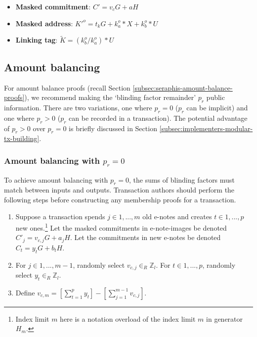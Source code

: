 \begin{itemize}
    \item \textbf{Masked commitment}: $C' = v_c G + a H$
    \item \textbf{Masked address}: $K'^o = t_k G + k^o_a*X + k^o_b*U$
    \item \textbf{Linking tag}: $\tilde{K} = (k^o_b/k^o_a)*U$
\end{itemize}


\subsection{Amount balancing}
\label{subsec:implementers-amount-balancing}

For amount balance proofs (recall Section \ref{subsec:seraphis-amount-balance-proofs}), we recommend making the `blinding factor remainder' $p_r$ public information. There are two variations, one where $p_r = 0$ ($p_r$ can be implicit) and one where $p_r > 0$ ($p_r$ can be recorded in a transaction). The potential advantage of $p_r > 0$ over $p_r = 0$ is briefly discussed in Section \ref{subsec:implementers-modular-tx-building}.

\subsubsection{Amount balancing with $p_r = 0$}

To achieve amount balancing with $p_r = 0$, the sums of blinding factors must match between inputs and outputs. Transaction authors should perform the following steps before constructing any membership proofs for a transaction.

\begin{enumerate}
    \item Suppose a transaction spends $j \in 1,...,m$ old e-notes and creates $t \in 1,...,p$ new ones.\footnote{Index limit $m$ here is a notation overload of the index limit $m$ in generator $H_m$.} Let the masked commitments in e-note-images be denoted $C'_j = v_{c,j} G + a_j H$. Let the commitments in new e-notes be denoted $C_t = y_t G + b_t H$.

    \item For $j \in 1,...,m-1$, randomly select $v_{c,j} \in_R \mathbb{Z}_l$. For $t \in 1,...,p$, randomly select $y_t \in_R \mathbb{Z}_l$.

    \item Define $v_{c,m} = [\sum^{p}_{t=1} y_t] - [\sum^{m-1}_{j=1} v_{c,j}]$.
\end{enumerate}

